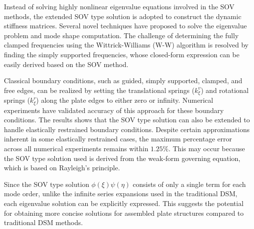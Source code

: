 \documentclass[preprint,12pt]{elsarticle}
\begin{document}
Instead of solving highly nonlinear eigenvalue equations involved in the SOV methods, the extended SOV type solution is adopted to construct the dynamic stiffness matrices.
Several novel techniques have proposed to solve the eigenvalue problem and mode shape computation.
The challenge of determining the fully clamped frequencies using the Wittrick-Williams (W-W) algorithm is resolved by finding the simply supported frequencies, whose closed-form expression can be easily derived based on the SOV method.  

Classical boundary conditions, such as guided, simply supported, clamped, and free edges, can be realized by setting the translational springs (\(k^v_\xi\)) and rotational springs (\(k^r_\xi\)) along the plate edges to either zero or infinity.  
Numerical experiments have validated accuracy of this approach for these boundary conditions.  
The results shows that the SOV type solution can also be extended to handle elastically restrained boundary conditions.
Despite certain approximations inherent in some elastically restrained cases, the maximum percentage error across all numerical experiments remains within $1.25\%$.  
This may occur because the SOV type solution used is derived from the weak-form governing equation, which is based on Rayleigh's principle.  

Since the SOV type solution \(\phi(\xi) \psi(\eta)\) consists of only a single term for each mode order, unlike the infinite series expansions used in the traditional DSM, each eigenvalue solution can be explicitly expressed.  
This suggests the potential for obtaining more concise solutions for assembled plate structures compared to traditional DSM methods.  
\end{document}
